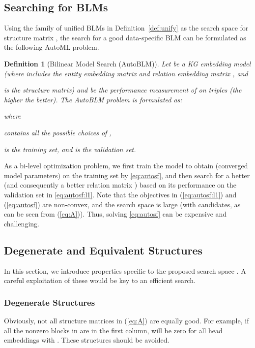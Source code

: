 \documentclass[10pt,journal,compsoc]{IEEEtran}
\newtheorem{definition}{Definition}
\begin{document}
\subsection{Searching for BLMs}
\label{ssec:searSFs}

Using the family of unified BLMs in Definition~\ref{def:unify} as the search
space  for structure matrix
,
the search for a good data-specific BLM 
can be formulated
as
the following 
AutoML problem.

\begin{definition}[Bilinear Model Search (AutoBLM)]
\label{def:autoSF}
Let  be
a KG embedding model (where 
 includes the
entity embedding matrix
 and relation embedding matrix ,
and 

is the structure matrix)
and  be the performance measurement
of  on triples 
(the higher the better).
The AutoBLM
 problem is formulated as:

where

contains all the possible choices of ,

is the training set, and 
 is the
validation set.
\end{definition}
As a bi-level optimization problem,
we first train the model to obtain  (converged model parameters) 
on the training set  by 
\eqref{eq:autosf},
and then search for a better  (and consequently a
better relation matrix 
)
based on its performance  on the validation set 
in \eqref{eq:autosf:l1}.
Note that the objectives
in (\ref{eq:autosf:l1}) and 
(\ref{eq:autosf})
are non-convex, and
the search space is large
(with  candidates, as can be seen from
(\ref{eq:A})).
Thus, solving \eqref{eq:autosf} can be expensive and
challenging.




\subsection{Degenerate and Equivalent Structures}
\label{ssec:challange}

In this section, 
we introduce properties specific to the proposed search space .
A careful exploitation of these would be key to an efficient
search.



\subsubsection{Degenerate Structures}
\label{sssec:degenerate}

Obviously, not all structure matrices 
in (\ref{eq:A})
are
equally good.
For example, if all the nonzero blocks 
in 
are in the first column,
 will be zero
for all head embeddings with .
These structures should be avoided.
\end{document}
